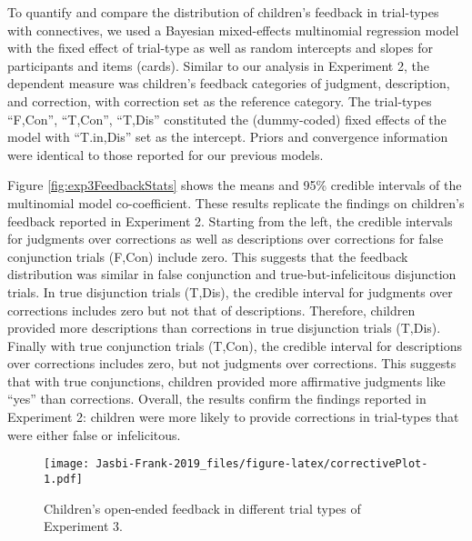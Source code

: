 \documentclass[,man,floatsintext]{apa6}
\begin{document}
To quantify and compare the distribution of children's feedback in trial-types with connectives, we used a Bayesian mixed-effects multinomial regression model with the fixed effect of trial-type as well as random intercepts and slopes for participants and items (cards). Similar to our analysis in Experiment 2, the dependent measure was children's feedback categories of judgment, description, and correction, with correction set as the reference category. The trial-types \enquote{F,Con}, \enquote{T,Con}, \enquote{T,Dis} constituted the (dummy-coded) fixed effects of the model with \enquote{T.in,Dis} set as the intercept. Priors and convergence information were identical to those reported for our previous models.

Figure \ref{fig:exp3FeedbackStats} shows the means and 95\% credible intervals of the multinomial model co-coefficient. These results replicate the findings on children's feedback reported in Experiment 2. Starting from the left, the credible intervals for judgments over corrections as well as descriptions over corrections for false conjunction trials (F,Con) include zero. This suggests that the feedback distribution was similar in false conjunction and true-but-infelicitous disjunction trials. In true disjunction trials (T,Dis), the credible interval for judgments over corrections includes zero but not that of descriptions. Therefore, children provided more descriptions than corrections in true disjunction trials (T,Dis). Finally with true conjunction trials (T,Con), the credible interval for descriptions over corrections includes zero, but not judgments over corrections. This suggests that with true conjunctions, children provided more affirmative judgments like \enquote{yes} than corrections. Overall, the results confirm the findings reported in Experiment 2: children were more likely to provide corrections in trial-types that were either false or infelicitous.

\begin{figure}
\centering
\texttt{[image: Jasbi-Frank-2019\_files/figure-latex/correctivePlot-1.pdf]}
\caption{\label{fig:correctivePlot}Children's open-ended feedback in different trial types of Experiment 3.}
\end{figure}
\end{document}
